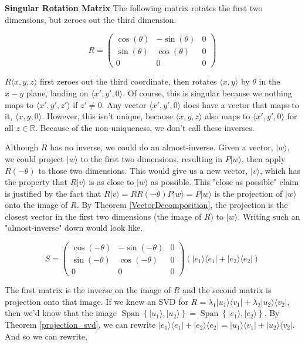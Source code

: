 \documentclass{amsbook}
\begin{document}
\begin{tcolorbox}[title=Example,colback=blue!5]
  {\bfseries\Large Singular Rotation Matrix}
The following matrix rotates the first two dimensions, but zeroes out the third dimension.

$$
R=\left(\begin{array}{ccc}\cos(\theta) & -\sin(\theta)&0 \\ \sin(\theta) & \cos(\theta)&0 \\ 0&0&0\end{array}\right)
$$

$R\langle x, y, z\rangle$ first zeroes out the third coordinate, then rotates $\langle x, y\rangle$ by $\theta$ in the $x-y$ plane, landing on $\langle x', y', 0\rangle$.  Of course, this is singular because we nothing maps to $\langle x', y', z'\rangle$ if $z'\neq0$.  Any vector $\langle x', y', 0\rangle$ does have a vector that maps to it, $\langle x, y, 0\rangle$.  However, this isn't unique, because $\langle x, y, z\rangle$ also maps to $\langle x', y', 0\rangle$ for all $z\in\mathbb R$.  Because of the non-uniqueness, we don't call these inverses.

Although $R$ has no inverse, we could do an almost-inverse.  Given a vector, $|w\rangle$, we could project $|w\rangle$ to the first two dimensions, resulting in $P|w\rangle$, then apply $R(-\theta)$ to those two dimensions.  This would give us a new vector, $|v\rangle$, which has the property that $R|v\rangle$ is as close to $|w\rangle$ as possible.  This "close as possible" claim is justified by the fact that $R|v\rangle=RR(-\theta)P|w\rangle=P|w\rangle$ is the projection of $|w\rangle$ onto the image of $R$.  By Theorem \ref{VectorDecomposition}, the projection is the closest vector in the first two dimensions (the image of $R$) to $|w\rangle$.  Writing such an "almost-inverse" down would look like.

$$
S=\left(\begin{array}{ccc}\cos(-\theta) & -\sin(-\theta)&0 \\ \sin(-\theta) & \cos(-\theta)&0 \\ 0&0&0\end{array}\right)\left(|e_1\rangle\langle e_1|+|e_2\rangle\langle e_2|\right)
$$

The first matrix is the inverse on the image of $R$ and the second matrix is projection onto that image.  If we knew an SVD for $R=\lambda_1|u_1\rangle\langle v_1|+\lambda_2|u_2\rangle\langle v_2|$, then we'd know that the image $\operatorname{Span}\left\{|u_1\rangle, |u_2\rangle\right\}=\operatorname{Span}\left\{|e_1\rangle, |e_2\rangle\right\}$.  By Theorem \ref{projection_svd}, we can rewrite $|e_1\rangle\langle e_1|+|e_2\rangle\langle e_2|=|u_1\rangle\langle v_1|+|u_2\rangle\langle v_2|$.  And so we can rewrite,


\end{tcolorbox}
\end{document}
